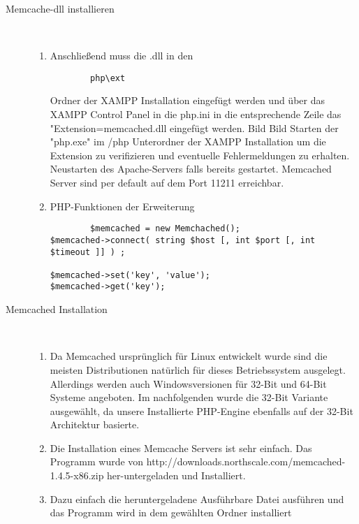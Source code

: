 \documentclass[a4paper, 12pt]{scrartcl}
\begin{document}
\begin{description}
\begin{enumerate}
\begin{verbatim}
      \end{verbatim}    
        	
   \end{enumerate}
   \item[Memcache-dll installieren]~\par
   \begin{enumerate}
   	 \item Anschließend muss die .dll in den 
   	 \begin{verbatim}
   	 	php\ext
   	 \end{verbatim} 
   	 Ordner der XAMPP Installation eingefügt werden und über das XAMPP Control Panel in die php.ini in die entsprechende Zeile das "Extension=memcached.dll eingefügt werden.
   	 Bild
   	 Bild 
   	 Starten der "php.exe" im /php Unterordner der XAMPP Installation um
   	 die Extension zu verifizieren und eventuelle Fehlermeldungen zu erhalten. Neustarten des Apache-Servers falls bereits gestartet. Memcached Server sind per default auf dem Port 11211 erreichbar.
   	 \item PHP-Funktionen der Erweiterung
   	 \begin{verbatim}
   	 	$memcached = new Memchached();
$memcached->connect( string $host [, int $port [, int $timeout ]] ) ;

$memcached->set('key', 'value');
$memcached->get('key');

   	 \end{verbatim}
   \end{enumerate}
   \item[Memcached Installation]~\par
   \begin{enumerate}
   		\item Da Memcached ursprünglich für Linux entwickelt wurde sind die meisten Distributionen natürlich für dieses Betriebssystem ausgelegt. Allerdings werden auch Windowsversionen für 32-Bit und 64-Bit Systeme angeboten. Im nachfolgenden wurde die 32-Bit Variante ausgewählt, da unsere Installierte PHP-Engine ebenfalls auf der 32-Bit Architektur basierte.
   		\item Die Installation eines Memcache Servers ist sehr einfach. Das Programm wurde von http://downloads.northscale.com/memcached-1.4.5-x86.zip her-untergeladen und Installiert.
   		\item Dazu einfach die heruntergeladene Ausführbare Datei ausführen und das Programm wird in dem gewählten Ordner installiert
   \end{enumerate}
   
\end{description}
\end{document}
